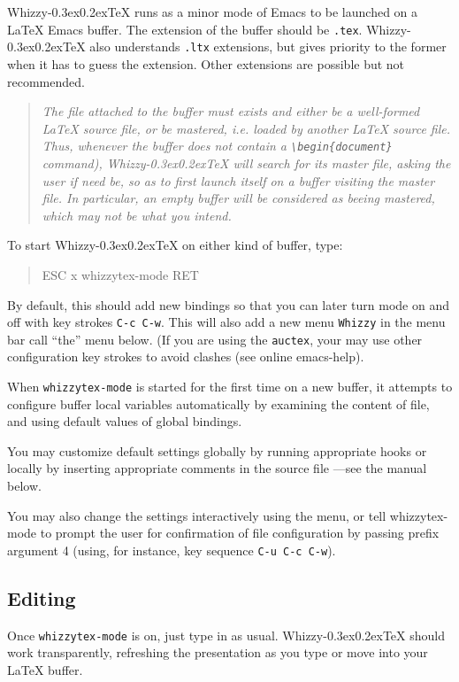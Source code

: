 \documentclass[12pt]{article}
\makeatletter
\let \lst \verb
\def \whizzy {{Whizzy\kern -0.3ex\raise 0.2ex\hbox{\let \@\relax\TeX}}}
\makeatother
\begin{document}
{\whizzy} runs as a minor mode of Emacs to be launched on a {\LaTeX} Emacs
buffer. The extension of the buffer should be
\lst".tex".  {\whizzy} also understands \lst".ltx" extensions, but gives
priority to the former when it has to guess the extension. Other extensions
are possible but not recommended.
\begin{quote}\em
The file attached to the buffer must exists and either be a well-formed
{\LaTeX} source file, or be {\em mastered}, {\em i.e.} loaded by another
{\LaTeX} source file. Thus, whenever the buffer does not contain a
\lst"\begin{document}" command), {\whizzy} will search for its master file,
asking the user if need be, so as to first launch itself on a buffer
visiting the master file. In particular, an empty buffer will be considered
as beeing mastered, which may not be what you intend.
\end{quote}
To start {\whizzy} on either kind of buffer, type:
\begin{quote}
\begin{tt}
ESC x whizzytex-mode RET
\end{tt}
\end{quote}
By default, this should add new bindings so that you can later turn mode
on and off with key strokes {\tt C-c C-w}. This will also add a new menu
{\tt Whizzy} in the menu bar call ``the'' menu below. (If you are using 
the {\tt auctex}, your may use other configuration key strokes to avoid
clashes (see online emacs-help). 

When {\tt whizzytex-mode} is started for the first time on a new buffer, it
attempts to configure buffer local variables automatically by examining
the content of file, and using default values of global bindings.

You may customize default settings globally by running appropriate
hooks or locally by inserting appropriate comments in the source file ---see
the manual below. 

You may also change the settings interactively using the menu, or tell
whizzytex-mode to prompt the user for confirmation of file configuration by
passing prefix argument 4 (using, for instance, key sequence 
\lst"C-u C-c C-w"). 


\subsection {Editing}

Once {\tt whizzytex-mode} is on, just type in as usual.  {\whizzy} should work
transparently, refreshing the presentation as you type or move into your
{\LaTeX} buffer. 
\end{document}
